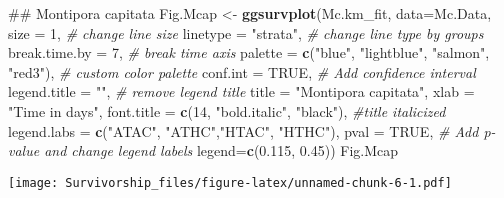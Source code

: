 \documentclass[]{article}
\newenvironment{Shaded}{\begin{snugshade}}{\end{snugshade}}
\newcommand{\KeywordTok}[1]{\textcolor[rgb]{0.13,0.29,0.53}{\textbf{#1}}}
\newcommand{\DataTypeTok}[1]{\textcolor[rgb]{0.13,0.29,0.53}{#1}}
\newcommand{\DecValTok}[1]{\textcolor[rgb]{0.00,0.00,0.81}{#1}}
\newcommand{\FloatTok}[1]{\textcolor[rgb]{0.00,0.00,0.81}{#1}}
\newcommand{\StringTok}[1]{\textcolor[rgb]{0.31,0.60,0.02}{#1}}
\newcommand{\CommentTok}[1]{\textcolor[rgb]{0.56,0.35,0.01}{\textit{#1}}}
\newcommand{\OtherTok}[1]{\textcolor[rgb]{0.56,0.35,0.01}{#1}}
\newcommand{\NormalTok}[1]{#1}
\begin{document}
\begin{Shaded}
\begin{Highlighting}[]
\NormalTok{## Montipora capitata}
\NormalTok{Fig.Mcap <-}\StringTok{ }\KeywordTok{ggsurvplot}\NormalTok{(Mc.km_fit, }\DataTypeTok{data=}\NormalTok{Mc.Data, }\DataTypeTok{size =} \DecValTok{1}\NormalTok{,  }\CommentTok{# change line size}
           \DataTypeTok{linetype =} \StringTok{"strata"}\NormalTok{, }\CommentTok{# change line type by groups}
           \DataTypeTok{break.time.by =} \DecValTok{7}\NormalTok{, }\CommentTok{# break time axis}
           \DataTypeTok{palette =} \KeywordTok{c}\NormalTok{(}\StringTok{"blue"}\NormalTok{, }\StringTok{"lightblue"}\NormalTok{, }\StringTok{"salmon"}\NormalTok{, }\StringTok{"red3"}\NormalTok{), }\CommentTok{# custom color palette}
           \DataTypeTok{conf.int =} \OtherTok{TRUE}\NormalTok{, }\CommentTok{# Add confidence interval}
           \DataTypeTok{legend.title =} \StringTok{""}\NormalTok{, }\CommentTok{# remove legend title}
           \DataTypeTok{title =} \StringTok{"Montipora capitata"}\NormalTok{,}
           \DataTypeTok{xlab =} \StringTok{"Time in days"}\NormalTok{,}
           \DataTypeTok{font.title =} \KeywordTok{c}\NormalTok{(}\DecValTok{14}\NormalTok{, }\StringTok{"bold.italic"}\NormalTok{, }\StringTok{"black"}\NormalTok{), }\CommentTok{#title italicized}
           \DataTypeTok{legend.labs =} \KeywordTok{c}\NormalTok{(}\StringTok{"ATAC"}\NormalTok{, }\StringTok{"ATHC"}\NormalTok{,}\StringTok{"HTAC"}\NormalTok{, }\StringTok{"HTHC"}\NormalTok{), }\DataTypeTok{pval =} \OtherTok{TRUE}\NormalTok{, }\CommentTok{# Add p-value and change legend labels}
           \DataTypeTok{legend=}\KeywordTok{c}\NormalTok{(}\FloatTok{0.115}\NormalTok{, }\FloatTok{0.45}\NormalTok{))}
\NormalTok{Fig.Mcap}
\end{Highlighting}
\end{Shaded}

\texttt{[image: Survivorship\_files/figure-latex/unnamed-chunk-6-1.pdf]}
\end{document}
